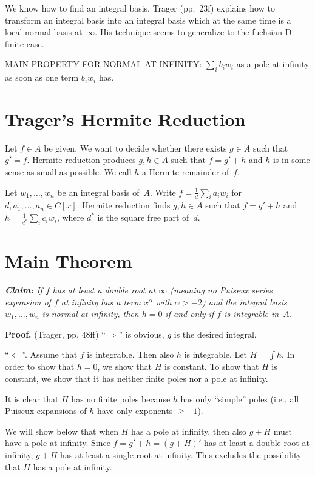 \documentclass[a4paper,draft]{article}
\begin{document}
We know how to find an integral basis. Trager (pp.~23f) explains how to transform an integral
basis into an integral basis which at the same time is a local normal basis at~$\infty$.
His technique seems to generalize to the fuchsian D-finite case. 

MAIN PROPERTY FOR NORMAL AT INFINITY: $\sum_i b_iw_i$ as a pole at infinity as soon as one term $b_iw_i$ has. 

\section{Trager's Hermite Reduction}

Let $f\in A$ be given. We want to decide whether there exists $g\in A$ such that $g'=f$.
Hermite reduction produces $g,h\in A$ such that $f=g'+h$ and $h$ is in some sense as small
as possible. We call $h$ a Hermite remainder of~$f$.

Let $w_1,\dots,w_n$ be an integral basis of~$A$. Write $f=\frac1d\sum_i a_iw_i$
for $d,a_1,\dots,a_n\in C[x]$.
Hermite reduction finds $g,h\in A$ such that $f=g'+h$ and $h=\frac1{d^*}\sum_i c_iw_i$,
where $d^*$ is the square free part of~$d$.

\section{Main Theorem}

\textit{%
  \textbf{Claim:}
  If $f$ has at least a double root at $\infty$
  (meaning no Puiseux series expansion of $f$ at infinity has a term $x^\alpha$ with $\alpha>-2$)
  and the integral basis $w_1,\dots,w_n$ is normal at infinity,
  then $h=0$ if and only if $f$ is integrable in~$A$.
}

\textbf{Proof.} (Trager, pp. 48ff)
``$\Rightarrow$'' is obvious, $g$ is the desired integral.

``$\Leftarrow$''. Assume that $f$ is integrable. Then also $h$ is integrable.
Let $H=\int h$.
In order to show that $h=0$, we show that $H$ is constant.
To show that $H$ is constant, we show that it has neither finite poles nor a pole at infinity.

It is clear that $H$ has no finite poles because $h$ has only ``simple'' poles (i.e., all Puiseux
expansions of $h$ have only exponents $\geq-1$).

We will show below that when $H$ has a pole at infinity, then also $g+H$ must have a pole at infinity.
Since $f=g'+h=(g+H)'$ has at least a double root at infinity, $g+H$ has at least
a single root at infinity. This excludes the possibility that $H$ has a pole at infinity.
\end{document}
